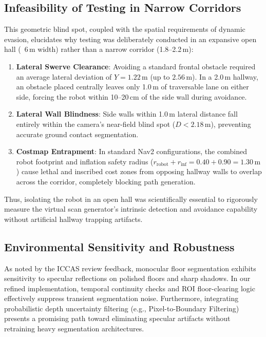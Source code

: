 \subsection{Infeasibility of Testing in Narrow Corridors}
This geometric blind spot, coupled with the spatial requirements of dynamic evasion, elucidates why testing was deliberately conducted in an expansive open hall (~6\,m width) rather than a narrow corridor (1.8--2.2\,m):
\begin{enumerate}
    \item \textbf{Lateral Swerve Clearance}: Avoiding a standard frontal obstacle required an average lateral deviation of $Y = 1.22\,\text{m}$ (up to $2.56\,\text{m}$). In a 2.0\,m hallway, an obstacle placed centrally leaves only 1.0\,m of traversable lane on either side, forcing the robot within 10--20\,cm of the side wall during avoidance.
    \item \textbf{Lateral Wall Blindness}: Side walls within 1.0\,m lateral distance fall entirely within the camera's near-field blind spot ($D < 2.18\,\text{m}$), preventing accurate ground contact segmentation.
    \item \textbf{Costmap Entrapment}: In standard Nav2 configurations, the combined robot footprint and inflation safety radius ($r_{\text{robot}} + r_{\text{inf}} = 0.40 + 0.90 = 1.30\,\text{m}$) cause lethal and inscribed cost zones from opposing hallway walls to overlap across the corridor, completely blocking path generation.
\end{enumerate}
Thus, isolating the robot in an open hall was scientifically essential to rigorously measure the virtual scan generator's intrinsic detection and avoidance capability without artificial hallway trapping artifacts.

\subsection{Environmental Sensitivity and Robustness}
As noted by the ICCAS review feedback, monocular floor segmentation exhibits sensitivity to specular reflections on polished floors and sharp shadows. In our refined implementation, temporal continuity checks and ROI floor-clearing logic effectively suppress transient segmentation noise. Furthermore, integrating probabilistic depth uncertainty filtering (e.g., Pixel-to-Boundary Filtering) presents a promising path toward eliminating specular artifacts without retraining heavy segmentation architectures.
